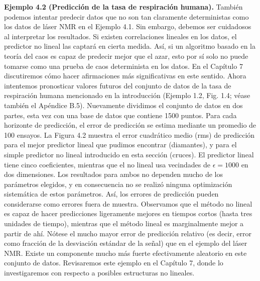\documentclass[10pt,a4paper]{book}
\begin{document}
\textbf{Ejemplo 4.2 (Predicción de la tasa de respiración humana).} También podemos intentar predecir datos que no son tan claramente deterministas como los datos de láser NMR en el Ejemplo 4.1. Sin embargo, debemos ser cuidadosos al interpretar los resultados. Si existen correlaciones lineales en los datos, el predictor no lineal las captará en cierta medida. Así, si un algoritmo basado en la teoría del caos es capaz de predecir mejor que el azar, esto por sí solo no puede tomarse como una prueba de caos determinista en los datos. En el Capítulo 7 discutiremos cómo hacer afirmaciones más significativas en este sentido. Ahora intentemos pronosticar valores futuros del conjunto de datos de la tasa de respiración humana mencionado en la introducción (Ejemplo 1.2, Fig. 1.4; véase también el Apéndice B.5). Nuevamente dividimos el conjunto de datos en dos partes, esta vez con una base de datos que contiene 1500 puntos. Para cada horizonte de predicción, el error de predicción se estima mediante un promedio de 100 ensayos. La Figura 4.2 muestra el error cuadrático medio (rms) de predicción para el mejor predictor lineal que pudimos encontrar (diamantes), y para el simple predictor no lineal introducido en esta sección (cruces). El predictor lineal tiene cinco coeficientes, mientras que el no lineal usa vecindades de $\epsilon = 1000$ en dos dimensiones. Los resultados para ambos no dependen mucho de los parámetros elegidos, y en consecuencia no se realizó ninguna optimización sistemática de estos parámetros. Así, los errores de predicción pueden considerarse como errores fuera de muestra. Observamos que el método no lineal es capaz de hacer predicciones ligeramente mejores en tiempos cortos (hasta tres unidades de tiempo), mientras que el método lineal es marginalmente mejor a partir de ahí. Nótese el mucho mayor error de predicción relativo (es decir, error como fracción de la desviación estándar de la señal) que en el ejemplo del láser NMR. Existe un componente mucho más fuerte efectivamente aleatorio en este conjunto de datos. Revisaremos este ejemplo en el Capítulo 7, donde lo investigaremos con respecto a posibles estructuras no lineales.

\bigskip
\end{document}
